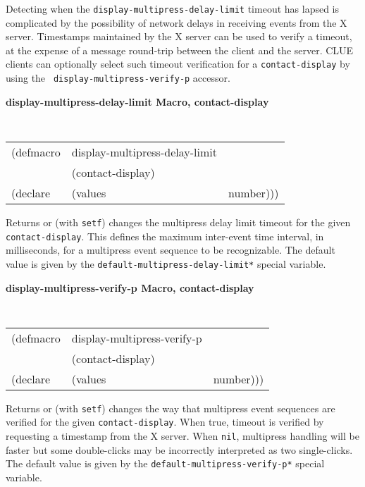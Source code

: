 \documentclass[twoside]{book}
\begin{document}
\begin{sloppy}
Detecting when the {\tt display-multipress-delay-limit} timeout has lapsed is
complicated by the possibility of network delays in
receiving events from the X server. 
Timestamps maintained by the X server can be used to verify a timeout, at
the expense of a message round-trip between the client and
the server. CLUE clients can optionally select such timeout
verification for a {\tt contact-display} by using the {\tt
display-multipress-verify-p} accessor.


{\samepage
{\large {\bf display-multipress-delay-limit \hfill Macro, contact-display}} 
\begin{flushright} \parbox[t]{6.125in}{
\tt
\begin{tabular}{lll}
\raggedright
(defmacro & display-multipress-delay-limit & \\ 
& (contact-display) \\
(declare &(values  & number)))
\end{tabular}
\rm

}\end{flushright}}

\begin{flushright} \parbox[t]{6.125in}{
Returns or (with {\tt setf}) changes the multipress delay limit timeout
for the given {\tt contact-display}. This defines the maximum
inter-event time
interval, in milliseconds, for a multipress event sequence to be
recognizable. The default value is given by the
{\tt *default-multipress-delay-limit*} special variable.
}\end{flushright}

{\samepage
{\large {\bf display-multipress-verify-p \hfill Macro, contact-display}} 
\begin{flushright} \parbox[t]{6.125in}{
\tt
\begin{tabular}{lll}
\raggedright
(defmacro & display-multipress-verify-p & \\ 
& (contact-display) \\
(declare &(values  & number)))
\end{tabular}
\rm

}\end{flushright}}

\begin{flushright} \parbox[t]{6.125in}{
Returns or (with {\tt setf}) changes the way that multipress event
sequences are verified for the given {\tt contact-display}. When true, 
timeout is verified by requesting
a timestamp from the X server. When {\tt nil}, multipress handling
will be faster but some double-clicks may be incorrectly interpreted as
two single-clicks. 
The default
value is given by the {\tt *default-multipress-verify-p*} special variable.
}\end{flushright}



\end{sloppy}
\end{document}
